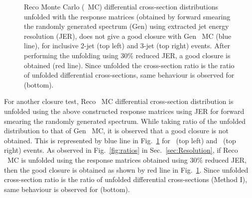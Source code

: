 \begin{figure}[!h]
\begin{center}
 \caption[Reco differential cross-section distributions unfolded with the response matrices.]{Reco \MadGraphFn\plusn \PYTHIAS Monte Carlo (\MGP~MC) differential cross-section distributions unfolded with the response matrices (obtained by forward smearing the randomly generated spectrum (Gen) using extracted jet energy resolution (JER), does not give a good closure with Gen \MGP~MC (blue line), for inclusive 2-jet (top left) and 3-jet (top right) events. After performing the unfolding using 30\% reduced JER, a good closure is obtained (red line). Since unfolded the cross-section ratio \ratio is the ratio of unfolded differential cross-sections, same behaviour is observed for \ratio (bottom).}
 \label{fig:unfolded_reco_NLO}
 \end{center}
\end{figure}

For another closure test, Reco \MGP~MC differential cross-section distribution is unfolded using the above constructed response matrices using JER for forward smearing the randomly generated spectrum. While taking ratio of the unfolded distribution to that of Gen \MGP~MC, it is observed that a good closure is not obtained. This is represented by blue line in Fig.~\ref{fig:unfolded_reco_NLO} for \njt~(top left) and \njth~(top right) events. As observed in Fig.~\ref{fig:ratios} in Sec.~\ref{sec:Resolution}, if Reco \MGP~MC is unfolded using the response matrices obtained using 30\% reduced JER, then the good closure is obtained as shown by red line in Fig.~\ref{fig:unfolded_reco_NLO}. Since unfolded cross-section ratio \ratio is the ratio of unfolded differential cross-sections (Method I), same behaviour is observed for \ratio (bottom). 


